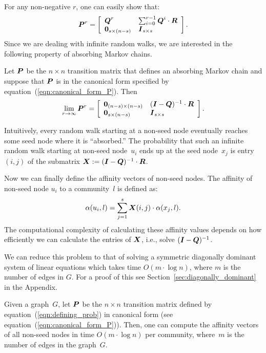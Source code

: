 For any non-negative $r$, one can easily show that:
\begin{equation}\label{exp:rth_product_of_P}
	\boldsymbol{P}^r = \left [ \begin{array}{ll}
						\boldsymbol{Q}^r  					& \sum_{i = 0}^{r - 1}\boldsymbol{Q}^i \cdot \boldsymbol{R} \\
						 \boldsymbol{0}_{s \times (n - s)} & \boldsymbol{I}_{s \times s}
						\end{array}
				\right ].
\end{equation}  
Since we are dealing with infinite random walks, we are interested in the following 
property of absorbing Markov chains.
\begin{proposition}\label{prop:limiting_Q}
	Let $\boldsymbol{P}$ be the $n \times n$ transition matrix that defines an absorbing Markov chain
	and suppose that $\boldsymbol{P}$ is in the canonical form specified by equation~(\ref{eqn:canonical_form_P}). 
	Then
    \begin{equation}
        \lim_{r \to \infty} \boldsymbol{P}^r = \left [ \begin{array}{ll}
            \boldsymbol{0}_{(n - s) \times (n - s)} & (\boldsymbol{I} - \boldsymbol{Q})^{-1} \cdot \boldsymbol{R} \\
            \boldsymbol{0}_{s \times (n - s)}       & \boldsymbol{I}_{s \times s}
        \end{array}
        \right ].
    \end{equation}  
\end{proposition}
Intuitively, every random walk starting at a non-seed node eventually 
reaches some seed node where it is ``absorbed.'' The probability 
that such an infinite random walk starting at non-seed node~$u_i$ ends 
up at the seed node~$x_j$ is entry $(i, j)$ of the 
submatrix $\boldsymbol{X} := (\boldsymbol{I} - \boldsymbol{Q})^{-1} \cdot \boldsymbol{R}$. 

Now we can finally define the affinity vectors of non-seed nodes.
The affinity of non-seed node $u_i$ to a community~$l$ is defined as:
\begin{equation}\label{eqn:belonging_vector}
    \alpha (u_i, l) = \sum_{j = 1}^{s} \boldsymbol{X} (i, j) \cdot \alpha (x_j, l).
\end{equation}
The computational complexity of calculating these affinity values  
depends on how efficiently we can calculate the entries of $\boldsymbol{X}$, 
i.e., solve $(\boldsymbol{I} - \boldsymbol{Q})^{-1}$. 

We can reduce this problem to that of solving a symmetric diagonally dominant 
system of linear equations which takes time $O(m \cdot \log n)$, where $m$
is the number of edges in $G$. For a proof of this see Section~\ref{sec:diagonally_dominant} in the Appendix.  
\begin{theorem}\label{theorem:computing_NR}
Given a graph~$G$, let $\boldsymbol{P}$ be the $n \times n$ transition matrix 
defined by equation~(\ref{eqn:defining_prob}) in canonical form 
(see equation~(\ref{eqn:canonical_form_P})). Then, one can compute 
the affinity vectors of all non-seed nodes in time $O(m \cdot \log n)$ per community, 
where~$m$ is the number of edges in the graph~$G$.
\end{theorem}  



